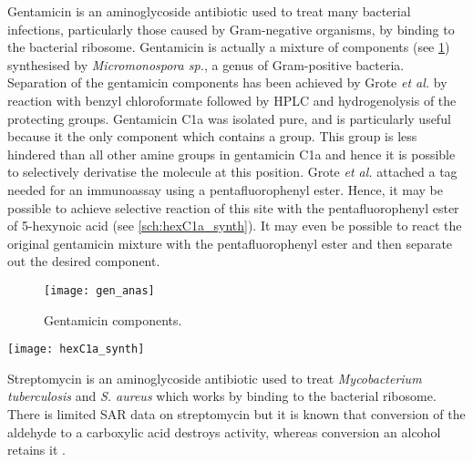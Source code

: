 Gentamicin is an aminoglycoside antibiotic used to treat many bacterial infections, particularly those caused by Gram-negative organisms, by binding to the bacterial ribosome. Gentamicin is actually a mixture of components (see \ref{fgr:gen_anas}) synthesised by \textit{Micromonospora sp.}, a genus of Gram-positive bacteria. Separation of the gentamicin components has been achieved by Grote \textit{et al.} \cite{Grote2012} by reaction with benzyl chloroformate followed by HPLC and hydrogenolysis of the protecting groups. 
Gentamicin C1a  was isolated pure, and is particularly useful because it the only component which contains a  group. This group is less hindered than all other amine groups in gentamicin C1a  and hence it is possible to selectively derivatise the molecule at this position. Grote \textit{et al.} attached a tag needed for an immunoassay using a pentafluorophenyl ester\cite{Cheshev2010}. Hence, it may be possible to achieve selective reaction of this site with the pentafluorophenyl ester of 5-hexynoic acid  (see \ref{sch:hexC1a_synth}). It may even be possible to react the original gentamicin mixture with the pentafluorophenyl ester  and then separate out the desired component.

\begin{figure}[H]
	\begin{center}
		\texttt{[image: gen\_anas]}
		\caption{Gentamicin components. \label{fgr:gen_anas}} 
	\end{center}
\end{figure}

\begin{scheme}[H]
	\begin{center}
		\texttt{[image: hexC1a\_synth]}
		\caption{Proposed synthesis of gentamicin C1a derivative . a) DIPEA, DMF, - 55 $^{\circ}$C. \label{sch:hexC1a_synth}}
	\end{center}
\end{scheme}


Streptomycin  is an aminoglycoside antibiotic used to treat \textit{Mycobacterium tuberculosis} and \textit{S. aureus} which works by binding to the bacterial ribosome. There is limited SAR data on streptomycin but it is known that conversion of the aldehyde to a carboxylic acid destroys activity, whereas conversion an alcohol retains it \cite{lemke2012foye}. 

